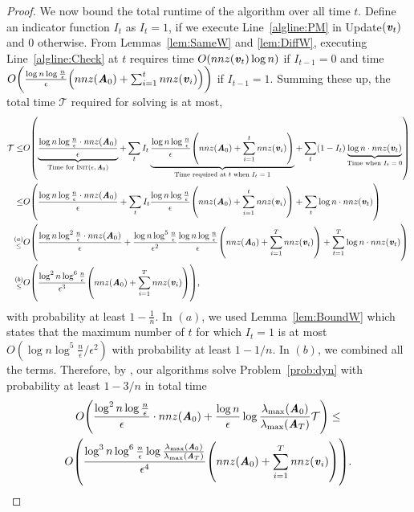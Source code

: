 \begin{proof}
We now bound the total runtime of the algorithm over all time $t$. Define an indicator function $I_t$ as $I_t = 1$, if we execute Line~\ref{algline:PM} in {\sc Update}$(\boldsymbol{\mathit{v}}_t)$ and $0$ otherwise. From Lemmas~\ref{lem:SameW} and \ref{lem:DiffW}, executing Line~\ref{algline:Check} at $t$ requires time $O(nnz(\boldsymbol{\mathit{v}}_t)\log n)$ if $I_{t-1} = 0$ and time $O\left(\frac{\log n\log \frac{n}{\epsilon}}{\epsilon}\left(nnz(\AA_0) +\sum_{i=1}^t nnz(\vv_i)\right)\right)$ if $I_{t-1} = 1$. Summing these up, the total time $\mathcal{T}$ required for solving  is at most,
\begin{align*}
\mathcal{T} \leq &  O\left(\underbrace{\frac{\log n\log \frac{n}{\epsilon} \cdot nnz(\AA_0)}{\epsilon}}_{\text{Time for {\sc Init}($\epsilon,\AA_0$)}} + \sum_t I_t \underbrace{\frac{\log n\log \frac{n}{\epsilon}}{\epsilon}\left(nnz(\AA_0) +\sum_{i=1}^t nnz(\vv_i)\right)}_{\text{Time required at $t$ when $I_t = 1$}} + \sum_t (1-I_t)\underbrace{\log n \cdot nnz(\vv_t)}_{\text{Time when $I_t=0$}}\right)\\
\leq & O\left( \frac{\log n\log \frac{n}{\epsilon}\cdot nnz(\AA_0)}{\epsilon}+ \sum_t I_t \frac{\log n\log \frac{n}{\epsilon}}{\epsilon}\left(nnz(\AA_0) +\sum_{i=1}^t nnz(\vv_i)\right) + \sum_t\log n\cdot  nnz(\vv_t)\right)\\
\substack{(a)\\ \leq}& O\left( \frac{\log n\log^2 \frac{n}{\epsilon}\cdot nnz(\AA_0)}{\epsilon}+ \frac{\log n\log^5\frac{n}{\epsilon}}{\epsilon^2}\frac{\log n\log \frac{n}{\epsilon}}{\epsilon} \left(nnz(\AA_0) +\sum_{i=1}^T nnz(\vv_i)\right) + \sum_{t=1}^T\log n\cdot nnz(\vv_t)\right)\\
\substack{(b)\\ \leq} & O\left( \frac{\log^2 n\log^6\frac{n}{\epsilon}}{\epsilon^3} \left(nnz(\AA_0) +\sum_{i=1}^T nnz(\vv_i)\right) \right),
\end{align*}
with probability at least $1-\frac{1}{n}$. In $(a)$, we used Lemma~\ref{lem:BoundW} which states that the maximum number of $t$ for which $I_t=1$ is at most $O(\log n\log^5\frac{n}{\epsilon}/\epsilon^2)$ with probability at least $1-1/n$. In $(b)$, we combined all the terms. Therefore, by , our algorithms solve Problem~\ref{prob:dyn} with probability at least $1-3/n$ in total time
\begin{multline*}
O\left(\frac{\log^2 n\log\frac{n}{\epsilon}}{\epsilon}\cdot nnz(\AA_0) + \frac{\log n}{\epsilon}\log \frac{\lambda_{\max}(\AA_0)}{\lambda_{\max}(\AA_T)}\mathcal{T}\right) \leq \\ O\left(\frac{\log^3 n\log^6 \frac{n}{\epsilon}\log \frac{\lambda_{\max}(\AA_0)}{\lambda_{\max}(\AA_T)}}{\epsilon^4}\left(nnz(\AA_0) +\sum_{i=1}^T nnz(\vv_i)\right)\right).
\end{multline*}
\end{proof}


